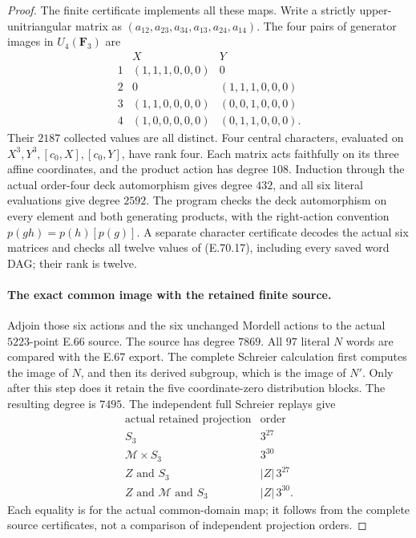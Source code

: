 \begin{proof}
The finite certificate implements all these maps.
Write a strictly upper-unitriangular matrix as
$(a_{12},a_{23},a_{34},a_{13},a_{24},a_{14})$.
The four pairs of generator images in $U_4(\mathbf F_3)$ are
\[
 \begin{array}{c|c|c}
 &X&Y\\ \hline
 1&(1,1,1,0,0,0)&0\\
 2&0&(1,1,1,0,0,0)\\
 3&(1,1,0,0,0,0)&(0,0,1,0,0,0)\\
 4&(1,0,0,0,0,0)&(0,1,1,0,0,0).
 \end{array}
 \tag{E.70.18}
\]
Their $2187$ collected values are all distinct.
Four central characters, evaluated on
$X^3,Y^3,[c_0,X],[c_0,Y]$, have rank four.
Each matrix acts faithfully
on its three affine coordinates, and the product
action has degree $108$. Induction through the
actual order-four deck automorphism gives degree
$432$, and all six literal evaluations give degree
$2592$. The program checks the deck automorphism
on every element and both generating products,
with the right-action convention
$p(gh)=p(h)[p(g)]$. A separate character certificate
decodes the actual six matrices and checks all
twelve values of (E.70.17), including every saved
word DAG; their rank is twelve.

\paragraph{The exact common image with the retained finite source.}
Adjoin those six actions and the six unchanged
Mordell actions to the actual $5223$-point E.66
source. The source has degree $7869$. All $97$
literal $N$ words are compared with the E.67
export. The complete Schreier calculation first
computes the image of $N$, and then its derived
subgroup, which is the image of $N'$. Only after
this step does it retain the five coordinate-zero
distribution blocks. The resulting degree is
$7495$. The independent full Schreier replays give
\[
 \begin{array}{c|c}
 \text{actual retained projection}&\text{order}\\ \hline
 S_3&3^{27}\\
 \mathcal M\times S_3&3^{30}\\
 Z\text{ and }S_3&|Z|\,3^{27}\\
 Z\text{ and }\mathcal M\text{ and }S_3&|Z|\,3^{30}.
 \end{array}
 \tag{E.70.19}
\]
Each equality is for the actual common-domain map;
it follows from the complete source certificates,
not a comparison of independent projection orders.


\end{proof}
